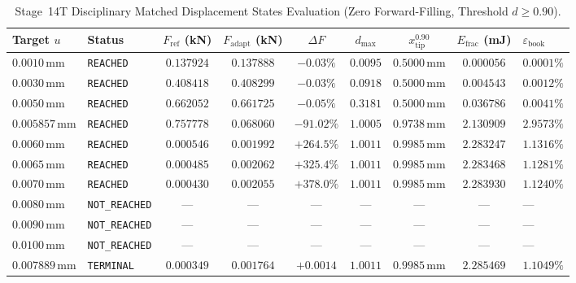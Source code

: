 \begin{table}[htbp]
\centering
\scriptsize
\setlength{\tabcolsep}{2.5pt}
\caption{Stage~14T Disciplinary Matched Displacement States Evaluation (Zero Forward-Filling, Threshold $d \ge 0.90$).}
\label{tab:stage14t_corrected_matched_states}
\begin{tabularx}{\textwidth}{l l c c c c c c Y}
\toprule
\textbf{Target $u$} & \textbf{Status} & $F_{\mathrm{ref}}$ (kN) & $F_{\mathrm{adapt}}$ (kN) & $\Delta F$ & $d_{\max}$ & $x_{\mathrm{tip}}^{0.90}$ & $E_{\mathrm{frac}}$ (mJ) & $\varepsilon_{\mathrm{book}}$ \\
\midrule
$0.0010\,\mathrm{mm}$ & \texttt{REACHED} & $0.137924$ & $0.137888$ & $-0.03\%$ & $0.0095$ & $0.5000\,\mathrm{mm}$ & $0.000056$ & $0.0001\%$ \\
$0.0030\,\mathrm{mm}$ & \texttt{REACHED} & $0.408418$ & $0.408299$ & $-0.03\%$ & $0.0918$ & $0.5000\,\mathrm{mm}$ & $0.004543$ & $0.0012\%$ \\
$0.0050\,\mathrm{mm}$ & \texttt{REACHED} & $0.662052$ & $0.661725$ & $-0.05\%$ & $0.3181$ & $0.5000\,\mathrm{mm}$ & $0.036786$ & $0.0041\%$ \\
$0.005857\,\mathrm{mm}$ & \texttt{REACHED} & $0.757778$ & $0.068060$ & $-91.02\%$ & $1.0005$ & $0.9738\,\mathrm{mm}$ & $2.130909$ & $2.9573\%$ \\
$0.0060\,\mathrm{mm}$ & \texttt{REACHED} & $0.000546$ & $0.001992$ & $+264.5\%$ & $1.0011$ & $0.9985\,\mathrm{mm}$ & $2.283247$ & $1.1316\%$ \\
$0.0065\,\mathrm{mm}$ & \texttt{REACHED} & $0.000485$ & $0.002062$ & $+325.4\%$ & $1.0011$ & $0.9985\,\mathrm{mm}$ & $2.283468$ & $1.1281\%$ \\
$0.0070\,\mathrm{mm}$ & \texttt{REACHED} & $0.000430$ & $0.002055$ & $+378.0\%$ & $1.0011$ & $0.9985\,\mathrm{mm}$ & $2.283930$ & $1.1240\%$ \\
$0.0080\,\mathrm{mm}$ & \texttt{NOT\_REACHED} & — & — & — & — & — & — & — \\
$0.0090\,\mathrm{mm}$ & \texttt{NOT\_REACHED} & — & — & — & — & — & — & — \\
$0.0100\,\mathrm{mm}$ & \texttt{NOT\_REACHED} & — & — & — & — & — & — & — \\
\midrule
$\mathbf{0.007889\,\mathrm{mm}}$ & \texttt{TERMINAL} & $\mathbf{0.000349}$ & $\mathbf{0.001764}$ & $\mathbf{+0.0014}$ & $\mathbf{1.0011}$ & $\mathbf{0.9985\,\mathrm{mm}}$ & $\mathbf{2.285469}$ & $\mathbf{1.1049\%}$ \\
\bottomrule
\end{tabularx}
\end{table}


